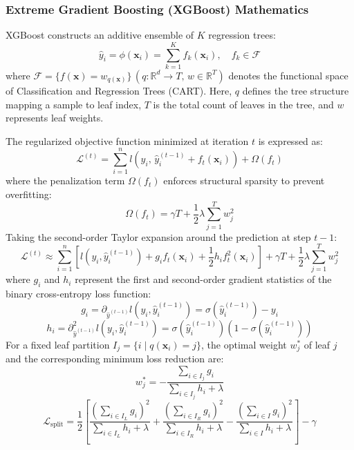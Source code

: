 \documentclass[11pt, a4paper]{article}
\begin{document}
\subsubsection{Extreme Gradient Boosting (XGBoost) Mathematics}
XGBoost constructs an additive ensemble of $K$ regression trees:
\begin{equation}
    \hat{y}_i = \phi(\mathbf{x}_i) = \sum_{k=1}^K f_k(\mathbf{x}_i), \quad f_k \in \mathcal{F}
\end{equation}
where $\mathcal{F} = \{f(\mathbf{x}) = w_{q(\mathbf{x})}\} \, (q: \mathbb{R}^d \to T, \, w \in \mathbb{R}^T)$ denotes the functional space of Classification and Regression Trees (CART). Here, $q$ defines the tree structure mapping a sample to leaf index, $T$ is the total count of leaves in the tree, and $w$ represents leaf weights.

The regularized objective function minimized at iteration $t$ is expressed as:
\begin{equation}
    \mathcal{L}^{(t)} = \sum_{i=1}^n l\left(y_i, \, \hat{y}_i^{(t-1)} + f_t(\mathbf{x}_i)\right) + \Omega(f_t)
\end{equation}
where the penalization term $\Omega(f_t)$ enforces structural sparsity to prevent overfitting:
\begin{equation}
    \Omega(f_t) = \gamma T + \frac{1}{2}\lambda \sum_{j=1}^T w_j^2
\end{equation}
Taking the second-order Taylor expansion around the prediction at step $t-1$:
\begin{equation}
    \mathcal{L}^{(t)} \approx \sum_{i=1}^n \left[ l\left(y_i, \hat{y}_i^{(t-1)}\right) + g_i f_t(\mathbf{x}_i) + \frac{1}{2} h_i f_t^2(\mathbf{x}_i) \right] + \gamma T + \frac{1}{2}\lambda \sum_{j=1}^T w_j^2
\end{equation}
where $g_i$ and $h_i$ represent the first and second-order gradient statistics of the binary cross-entropy loss function:
\begin{equation}
    g_i = \partial_{\hat{y}^{(t-1)}} l\left(y_i, \hat{y}_i^{(t-1)}\right) = \sigma\left(\hat{y}_i^{(t-1)}\right) - y_i
\end{equation}
\begin{equation}
    h_i = \partial^2_{\hat{y}^{(t-1)}} l\left(y_i, \hat{y}_i^{(t-1)}\right) = \sigma\left(\hat{y}_i^{(t-1)}\right)\left(1 - \sigma\left(\hat{y}_i^{(t-1)}\right)\right)
\end{equation}
For a fixed leaf partition $I_j = \{i \mid q(\mathbf{x}_i) = j\}$, the optimal weight $w_j^*$ of leaf $j$ and the corresponding minimum loss reduction are:
\begin{equation}
    w_j^* = -\frac{\sum_{i \in I_j} g_i}{\sum_{i \in I_j} h_i + \lambda}
\end{equation}
\begin{equation}
    \mathcal{L}_{\text{split}} = \frac{1}{2} \left[ \frac{\left(\sum_{i \in I_L} g_i\right)^2}{\sum_{i \in I_L} h_i + \lambda} + \frac{\left(\sum_{i \in I_R} g_i\right)^2}{\sum_{i \in I_R} h_i + \lambda} - \frac{\left(\sum_{i \in I} g_i\right)^2}{\sum_{i \in I} h_i + \lambda} \right] - \gamma
\end{equation}
\end{document}
